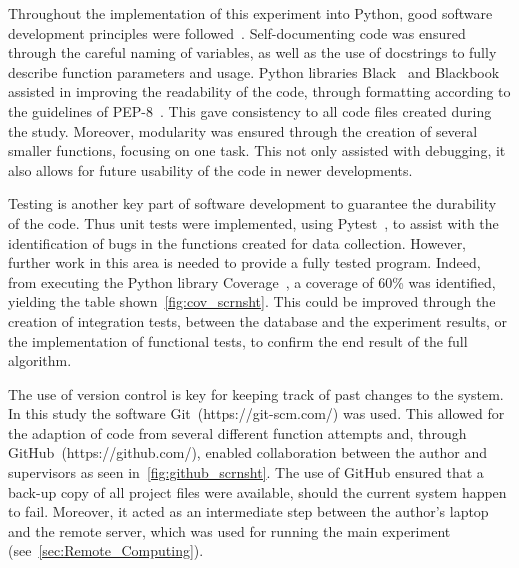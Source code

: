 Throughout the implementation of this experiment into Python, good software
development principles were followed~\cite{Jimenez2017, Sandve2013, Wilson2014}. Self-documenting code was 
ensured through the careful naming of variables, as well as the use of 
docstrings to fully describe function parameters and usage. Python libraries 
Black~\cite{Langa2019} and Blackbook~\cite{Knight2019a} assisted in improving the readability of the code, through 
formatting according to the guidelines of PEP-8~\cite{Rossum2001}. This gave consistency to all 
code files created during the study. Moreover, modularity was ensured through the creation of several 
smaller functions, focusing on one task. This not only assisted with debugging,
it also allows for future usability of the code in newer developments.

Testing is another key part of software development to guarantee the durability of 
the code. Thus unit tests were implemented, using Pytest~\cite{pytestx.y}, to
assist with the 
identification of bugs in the functions created for data collection. However, 
further work in this area is needed to provide a fully tested program. 
Indeed, from executing the Python library Coverage~\cite{Batchelder2020}, a coverage of 60\% was identified, 
yielding the table shown~\autoref{fig:cov_scrnsht}. This could be improved through the creation of 
integration tests, between the database and the experiment results, or the 
implementation of functional tests, to confirm the end result of the full 
algorithm.


The use of version control is key for keeping track of past changes 
to the system. In this study the software Git~(https://git-scm.com/) was used. This allowed for the 
adaption of code from several different function attempts and, through GitHub~(https://github.com/), 
enabled collaboration between the author and supervisors as seen
in~\autoref{fig:github_scrnsht}. The use of GitHub ensured that a back-up copy
of all project files 
were available, should the current system happen to fail. Moreover, it acted as
an intermediate step between the author's laptop and the remote server, which
was used for
running the main experiment (see~\autoref{sec:Remote_Computing}).

